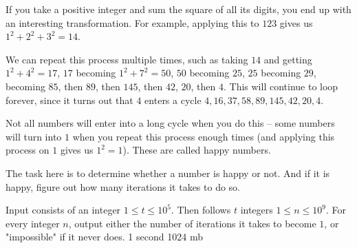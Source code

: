 {If you take a positive integer and sum the square of all its digits, you end up with an interesting transformation. For example, applying this to $123$ gives us $1^2 + 2^2 + 3^2 = 14$.

We can repeat this process multiple times, such as taking $14$ and getting $1^2 + 4^2 = 17$, $17$ becoming $1^2 + 7^2 = 50$, $50$ becoming $25$, $25$ becoming $29$, becoming $85$, then $89$, then $145$, then $42$, $20$, then $4$. This will continue to loop forever, since it turns out that $4$ enters a cycle $4,16,37,58,89,145,42,20,4$.

Not all numbers will enter into a long cycle when you do this -- some numbers will turn into $1$ when you repeat this process enough times (and applying this process on $1$ gives us $1^2 = 1$). These are called happy numbers.

The task here is to determine whether a number is happy or not. And if it is happy, figure out how many iterations it takes to do so.}
{Input consists of an integer $1 \le t \le 10^5$. Then follows $t$ integers $1 \le n \le 10^9$.}
{For every integer $n$, output either the number of iterations it takes to become $1$, or "impossible" if it never does.}
{1 second}
{1024 mb}
{}